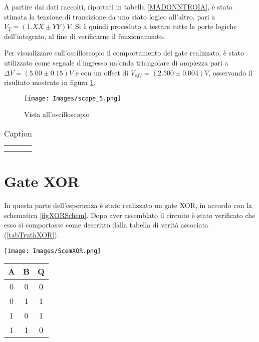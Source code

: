 \documentclass{article}
\begin{document}
    A partire dai dati raccolti, riportati in tabella \ref{MADONNTROIA}, è stata stimata la tensione di transizione da uno stato logico all'altro, pari a $V_T = (1.XX\pm YY)V$.
    Si è quindi proceduto a testare tutte le porte logiche dell'integrato, al fine di verificarne il funzionamento.
    
    Per visualizzare sull'oscilloscopio il comportamento del gate realizzato, è stato utilizzato come segnale d'ingresso un'onda triangolare di ampiezza pari a $\Delta V=(5.00\pm0.15)V$ e con un offset di $V_{off}=(2.500\pm0.004)V$, osservando il risultato mostrato in figura \ref{figNotOsc}.
    \begin{figure}[H]
        \centering
        \texttt{[image: Images/scope\_5.png]}
        \caption{Vista all'oscilloscopio}
        \label{figNotOsc}
    \end{figure}

    \begin{table}[]
        \centering
        \begin{tabular}{c|c}
             &  \\
             & 
        \end{tabular}
        \caption{Caption}
        \label{MADONNATROIA}
    \end{table}
\newpage

\section{Gate XOR}
    In questa parte dell'esperienza è stato realizzato un gate XOR, in accordo con la schematica \ref{figXORSchem}. Dopo aver assemblato il circuito è stato verificato che esso si comportasse come descritto dalla tabella di verità associata (\ref{tabTruthXOR}).
  
    \begin{minipage}{\textwidth}
    \begin{minipage}[b]{0.49\textwidth}
        \centering
        \texttt{[image: Images/ScemXOR.png]}
        \label{figXORSchem}
    \end{minipage}
    \hfill
    \begin{minipage}[b]{0.49\textwidth}
        \centering
        \begin{tabular}{ | c | c | c |}
           \hline
           A & B & Q \\ \hline \hline
           0 & 0 & 0 \\ \hline
           0 & 1 & 1 \\ \hline
           1 & 0 & 1 \\ \hline
           1 & 1 & 0 \\ \hline
        \end{tabular}
        \label{tabTruthXOR}
        \end{minipage}
    \end{minipage}
    \vspace{1cm}
    
\end{document}

